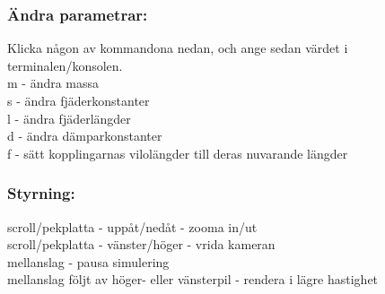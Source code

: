 \documentclass[a4paper,12pt,oneside,final,swedish]{extarticle}
\begin{document}
\subsubsection{Ändra parametrar:}
Klicka någon av kommandona nedan, och ange sedan värdet i terminalen/konsolen.
\\m - ändra massa
\\s - ändra fjäderkonstanter
\\l - ändra fjäderlängder
\\d - ändra dämparkonstanter
\\f - sätt kopplingarnas vilolängder till deras nuvarande längder
\subsubsection{ Styrning:}
scroll/pekplatta - uppåt/nedåt - zooma in/ut
\\scroll/pekplatta - vänster/höger - vrida kameran
\\mellanslag - pausa simulering
\\mellanslag följt av höger- eller vänsterpil - rendera i lägre hastighet
\end{document}
